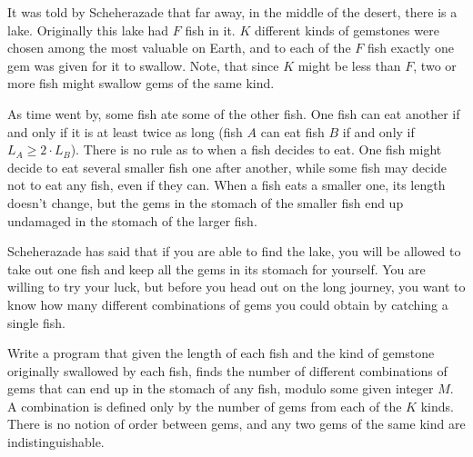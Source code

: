 It was told by Scheherazade that far away, in the middle of the desert, there is a lake. Originally this lake had $F$ fish in it. $K$ different kinds of gemstones were chosen among the most valuable on Earth, and to each of the $F$ fish exactly one gem was given for it to swallow. Note, that since $K$ might be less than $F$, two or more fish might swallow gems of the same kind.

As time went by, some fish ate some of the other fish. One fish can eat another if and only if it is at least twice as long (fish $A$ can eat fish $B$ if and only if $L_A \ge 2 \cdot L_B$). There is no rule as to when a fish decides to eat. One fish might decide to eat several smaller fish one after another, while some fish may decide not
to eat any fish, even if they can.  When a fish eats a smaller one, its length doesn't change, but the gems in the stomach of the smaller fish end up undamaged in the stomach of the larger fish.

Scheherazade has said that if you are able to find the lake, you will be allowed to take out one fish and keep all the gems in its stomach for yourself. You are willing to try your luck, but before you head out on the long journey, you want to know how many different combinations of gems you could obtain by catching a single fish.

Write a program that given the length of each fish and the kind of gemstone originally swallowed by each fish, finds the number of different combinations of gems that can end up in the stomach of any fish, modulo some given integer $M$. A combination is defined only by the number of gems from each of the $K$ kinds. There is no notion of order between gems, and any two gems of the same kind are indistinguishable.
